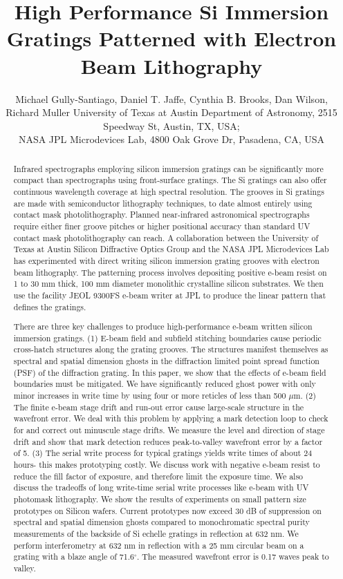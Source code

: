 \documentclass[]{spie}  %
\title{High Performance Si Immersion Gratings Patterned with Electron Beam Lithography}
\author{Michael Gully-Santiago\supit{a}, Daniel T. Jaffe\supit{a}, Cynthia B. Brooks\supit{a}, Dan Wilson\supit{b}, Richard Muller\supit{b}
\skiplinehalf
\supit{a}University of Texas at Austin Department of Astronomy, 2515 Speedway St, Austin, TX, USA; \\
\supit{b}NASA JPL Microdevices Lab, 4800 Oak Grove Dr, Pasadena, CA, USA
}
\begin{document}
 
  \maketitle 

\begin{abstract}
Infrared spectrographs employing silicon immersion gratings can be significantly more compact than spectrographs using front-surface gratings.  The Si gratings can also offer continuous wavelength coverage at high spectral resolution.  The grooves in Si gratings are made with semiconductor lithography techniques, to date almost entirely using contact mask photolithography.  Planned near-infrared astronomical spectrographs require either finer groove pitches or higher positional accuracy than standard UV contact mask photolithography can reach.  A collaboration between the University of Texas at Austin Silicon Diffractive Optics Group and the NASA JPL Microdevices Lab has experimented with direct writing silicon immersion grating grooves with electron beam lithography.  The patterning process involves depositing positive e-beam resist on 1 to 30 mm thick, 100 mm diameter monolithic crystalline silicon substrates.  We then use the facility JEOL 9300FS e-beam writer at JPL to produce the linear pattern that defines the gratings.

There are three key challenges to produce high-performance e-beam written silicon immersion gratings.  (1) E-beam field and subfield stitching boundaries cause periodic cross-hatch structures along the grating grooves.   The structures manifest themselves as spectral and spatial dimension ghosts in the diffraction limited point spread function (PSF) of the diffraction grating.  In this paper, we show that the effects of e-beam field boundaries must be mitigated.  We have significantly reduced ghost power with only minor increases in write time by using four or more reticles of less than 500 $\mu$m. (2) The finite e-beam stage drift and run-out error cause large-scale structure in the wavefront error.  We deal with this problem by applying a mark detection loop to check for and correct out minuscule stage drifts.  We measure the level and direction of stage drift and show that mark detection reduces peak-to-valley wavefront error by a factor of 5. (3) The serial write process for typical gratings yields write times of about 24 hours- this makes prototyping costly.  We discuss work with negative e-beam resist to reduce the fill factor of exposure, and therefore limit the exposure time.
We also discuss the tradeoffs of long write-time serial write processes like e-beam with UV photomask lithography.  We show the results of experiments on small pattern size prototypes on Silicon wafers.  Current prototypes now exceed 30 dB of suppression on spectral and spatial dimension ghosts compared to monochromatic spectral purity measurements of the backside of Si echelle gratings in reflection at 632 nm.  We perform interferometry at 632 nm in reflection with a 25 mm circular beam on a grating with a blaze angle of 71.6$^\circ$.  The measured wavefront error is 0.17 waves peak to valley.
\end{abstract}
\end{document}
